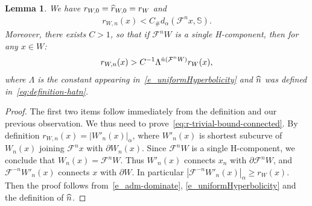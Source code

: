 \documentclass[10pt]{amsart}
\newtheorem{lemm}[theo]{Lemma}\newtheorem{prop}[theo]{Proposition}\newtheorem{coro}[theo]{Corollary}\newtheorem{conj}[theo]{Conjecture}
\theoremstyle{definition}\newtheorem{defi}[theo]{Definition}\newtheorem{rema}[theo]{Remark}\newtheorem{exam}[theo]{Example}\newtheorem{exem}[theo]{Example}\newtheorem{nota}[theo]{Notation}
\newcommand{\const}{C_\#}
\newcommand{\inv}{^{-1}}
\newcommand{\hhs}{\mathbb{S}}
\newcommand{\cm}{\mathcal{F}}
\newcommand{\dadm}[1]{\dadmPrivate^{#1}}
\newcommand{\dadmPrivate}{d\adm}
\newcommand{\adm}{_{\alpha^{+}}}
\renewcommand{\adm}{_{\alpha}}
\renewcommand{\dadm}{d\adm}
\let\oldhat\hat
\renewcommand*{\hat}[1]{\mathchoice{\widehat{#1}}{\widehat{#1}}{\oldhat{#1}}{\oldhat{#1}}}
\begin{document}
\begin{lemm}
We have $r_{W,0} = \hat r_{W,0} = r_{W}$ and
\begin{align}\label{eq:silly-bound-on-r}
r_{W,n}(x) < \const \dadm(\cm^{n}x,\hhs).
\end{align}
Moreover, there exists $C > 1$, so that if $\cm^{n}W$ is a single H-component, then for any $x\in W$:
\begin{align}\label{eq:r-trivial-bound-connected}
r_{W,n}(x) > C\inv\Lambda^{\hat n(\cm^{n}W)} r_{W}(x),
\end{align}
where $\Lambda$ is the constant appearing in~\eqref{e_uniformHyperbolicity} and $\hat n$ was defined in~\eqref{eq:definition-hatn}.
\end{lemm}
\begin{proof}
The first two items follow immediately from the definition and our previous observation. We thus need to prove~\eqref{eq:r-trivial-bound-connected}. By definition $r_{W,n}(x) = |W'_{n}(x)|\adm$, where $W'_{n}(x)$ is shortest subcurve of $W_{n}(x)$ joining $\cm^{n}x$ with $\partial W_{n}(x)$. Since $\cm^{n}W$ is a single H-component, we conclude that $W_{n}(x) = \cm^{n}W$. Thus $W'_{n}(x)$ connects $x_{n}$ with $\partial \cm^{n}W$, and $\cm^{-n}W'_{n}(x)$ connects $x$ with $\partial W$. In particular $|\cm^{-n}W'_{n}(x)|\adm\ge r_{W}(x)$. Then the proof follows from~\eqref{e_adm-dominate}, \eqref{e_uniformHyperbolicity} and the definition of $\hat n$.
\end{proof}
\end{document}
